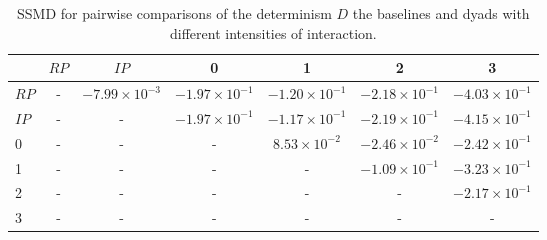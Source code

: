 \begin{table}
\centering
\caption{SSMD for pairwise comparisons of the determinism $D$ the baselines and dyads with different intensities of interaction.}
\label{tab:ssmd_determinism}
\begin{tabular}{lcccccc}
\toprule
 & $RP$ & $IP$ & 0 & 1 & 2 & 3 \\
\midrule
$RP$ & - & $-7.99 \times 10^{-3}$ & $-1.97 \times 10^{-1}$ & $-1.20 \times 10^{-1}$ & $-2.18 \times 10^{-1}$ & $-4.03 \times 10^{-1}$ \\
$IP$ & - & - & $-1.97 \times 10^{-1}$ & $-1.17 \times 10^{-1}$ & $-2.19 \times 10^{-1}$ & $-4.15 \times 10^{-1}$ \\
0 & - & - & - & $8.53 \times 10^{-2}$ & $-2.46 \times 10^{-2}$ & $-2.42 \times 10^{-1}$ \\
1 & - & - & - & - & $-1.09 \times 10^{-1}$ & $-3.23 \times 10^{-1}$ \\
2 & - & - & - & - & - & $-2.17 \times 10^{-1}$ \\
3 & - & - & - & - & - & - \\
\bottomrule
\end{tabular}
\end{table}
